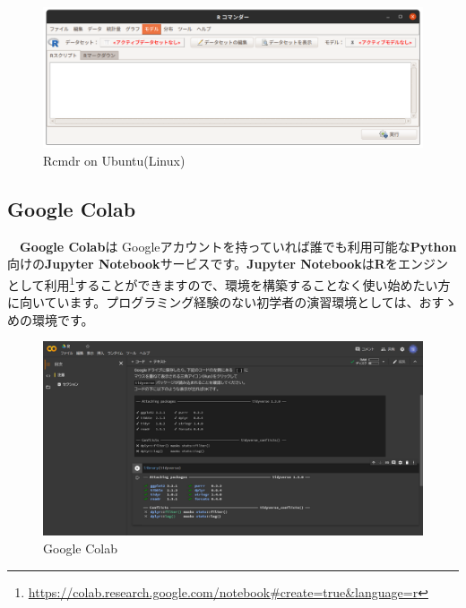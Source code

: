 \documentclass[
  12pt,
]{book}
\DeclareRobustCommand{\href}[2]{#2\footnote{\url{#1}}}
\begin{document}
\begin{figure}[H]

{\centering \includegraphics[width=0.9\linewidth,]{./fig/RCmdr} 

}

\caption{Rcmdr on Ubuntu(Linux)}\label{fig:unnamed-chunk-21}
\end{figure}

\hypertarget{google-colab}{%
\subsection{\texorpdfstring{Google Colab}{Google Colab}}\label{google-colab}}

　\textbf{Google Colab}は Googleアカウントを持っていれば誰でも利用可能な\textbf{Python}向けの\textbf{Jupyter Notebook}サービスです。\href{https://colab.research.google.com/notebook\#create=true\&language=r}{\textbf{Jupyter Notebook}は\textbf{R}をエンジンとして利用}することができますので、環境を構築することなく使い始めたい方に向いています。プログラミング経験のない初学者の演習環境としては、おすゝめの環境です。

\begin{figure}[H]

{\centering \includegraphics[width=0.9\linewidth,]{./fig/Colab/Firsttime} 

}

\caption{Google Colab}\label{fig:unnamed-chunk-22}
\end{figure}
\end{document}
